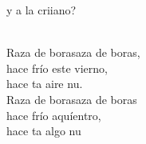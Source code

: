 \begin{cancion}
	y a la  criiano?\\\jump\\
	\begin{chorus}%
	Raza de borasaza de boras, \\
	hace frío este vierno,\\
	hace ta aire nu.\\
	Raza de borasaza de boras \\
	hace frío aquíentro, \\
	hace ta algo nu\\
	\end{chorus}%
	\jump\\
	     \\
\end{cancion}%
